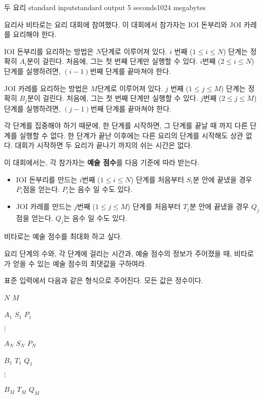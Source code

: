 \begin{problem}{두 요리}
	{standard input}{standard output}
	{5 seconds}{1024 megabytes}{}
	
	요리사 비타로는 요리 대회에 참여했다. 이 대회에서 참가자는 IOI 돈부리와 JOI 카레를 요리해야 한다.
	
	IOI 돈부리를 요리하는 방법은 $N$단계로 이루어져 있다. $i$ 번째 ($1 \le i \le N$) 단계는 정확히 $A_i$분이 걸린다. 처음에, 그는 첫 번째 단계만 실행할 수 있다. $i$번째 ($2 \le i \le N$) 단계를 실행하려면, $(i-1)$번째 단계를 끝마쳐야 한다.
	
	JOI 카레를 요리하는 방법은 $M$단계로 이루어져 있다. $j$ 번째 ($1 \le j \le M$) 단계는 정확히 $B_j$분이 걸린다. 처음에, 그는 첫 번째 단계만 실행할 수 있다. $j$번째 ($2 \le j \le M$) 단계를 실행하려면, $(j-1)$번째 단계를 끝마쳐야 한다.
	
	각 단계를 집중해야 하기 때문에, 한 단계를 시작하면, 그 단계를 끝날 때 까지 다른 단계를 실행할 수 없다. 한 단계가 끝난 이후에는 다른 요리의 단계를 시작해도 상관 없다. 대회가 시작하면 두 요리가 끝나기 까지의 쉬는 시간은 없다.
	
	이 대회에서는, 각 참가자는 \textbf{예술 점수}를 다음 기준에 따라 받는다.
	
	\begin{itemize}
		\item IOI 돈부리를 만드는 $i$번째 ($1 \le i \le N$) 단계를 처음부터 $S_i$분 안에 끝냈을 경우 $P_i$점을 얻는다. $P_i$는 음수 일 수도 있다.
		\item JOI 카레를 만드는 $j$번째 ($1 \le j \le M$) 단계를 처음부터 $T_j$분 안에 끝냈을 경우 $Q_j$점을 얻는다. $Q_j$는 음수 일 수도 있다.
	\end{itemize} 

	비타로는 예술 점수를 최대화 하고 싶다.
	
	요리 단계의 수와, 각 단계에 걸리는 시간과, 예술 점수의 정보가 주어졌을 때, 비타로가 얻을 수 있는 예술 점수의 최댓값을 구하여라.
	
	\InputFile
	
	표준 입력에서 다음과 같은 형식으로 주어진다. 모든 값은 정수이다.
	
	$N$ $M$
	
	$A_1$ $S_1$ $P_1$
	
	$\vdots$
	
	$A_N$ $S_N$ $P_N$
		
	$B_1$ $T_1$ $Q_1$
	
	$\vdots$
	
	$B_M$ $T_M$ $Q_M$
	
	\OutputFile
	

\end{problem}
